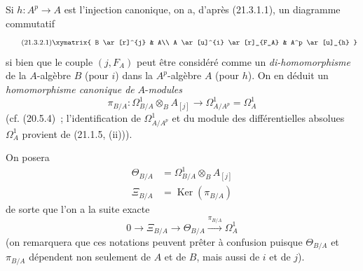 \begin{env}[21.3.2]
\label{0.21.3.2-fr}
Si $h:A^p\to A$ est l'injection canonique, on a, d'après (21.3.1.1), un diagramme commutatif
\begin{equation}
\tag{21.3.2.1}\label{0.21.3.2.1-fr}
\xymatrix{
 B \ar[r]^{j} & A\\
 A \ar[u]^{i} \ar[r]_{F_A} & A^p \ar[u]_{h}
}
\end{equation}
si bien que le couple $(j,F_A)$ peut être considéré comme un \emph{di-homomorphisme}
de la $A$-algèbre $B$ (pour $i$) dans la $A^p$-algèbre $A$ (pour $h$).
On en déduit un \emph{homomorphisme canonique de} $A$-\emph{modules}
\begin{equation}
\tag{21.3.2.2}\label{0.21.3.2.2-fr}
\pi_{B/A}:\Omega^1_{B/A}\otimes_B A_{[j]}\longrightarrow
\Omega^1_{A/A^p}=\Omega^1_A
\end{equation}
(cf. (20.5.4)~; l'identification de $\Omega^1_{A/A^p}$ et du module des
différentielles absolues $\Omega^1_A$ provient de (21.1.5, (ii))).

On posera
\begin{align}
\tag{21.3.2.3}\label{0.21.3.2.3-fr}
\Theta_{B/A}&=\Omega^1_{B/A}\otimes_B A_{[j]}\\
\tag{21.3.2.4}\label{0.21.3.2.4-fr}
\Xi_{B/A}&=\operatorname{Ker}(\pi_{B/A})
\end{align}
de sorte que l'on a la suite exacte
\begin{equation}
\tag{21.3.2.5}\label{0.21.3.2.5-fr}
0\to\Xi_{B/A}\to\Theta_{B/A}\xrightarrow{\pi_{B/A}}\Omega^1_A
\end{equation}
(on remarquera que ces notations peuvent prêter à confusion puisque
$\Theta_{B/A}$ et $\pi_{B/A}$ dépendent non seulement de $A$ et de $B$,
mais aussi de $i$ et de $j$).
\end{env}

